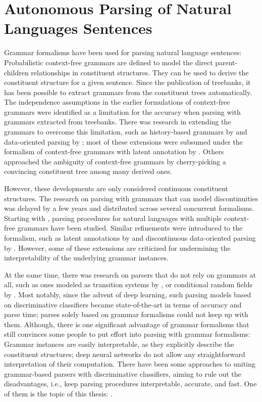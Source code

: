 \documentclass[../document.tex]{subfiles}
\begin{document}
    \section*{Autonomous Parsing of Natural Languages Sentences}
    Grammar formalisms have been used for parsing natural language sentences:
        Probabilistic context-free grammars are defined to model the direct parent-children relationships in constituent structures.
        They can be used to derive the constituent structure for a given sentence. \citep{Sup72}
    Since the publication of treebanks, it has been possible to extract grammars from the constituent trees automatically.
    The independence assumptions in the earlier formulations of context-free grammars were identified as a limitation for the accuracy when parsing with grammars extracted from treebanks. \citep[e.g.\@][Section~1.1]{collins2001convolution}
    There was research in extending the grammars to overcome this limitation, such as history-based grammars by \citet{Black94} and data-oriented parsing by \citet{Bod92}; most of these extensions were subsumed under the formalism of context-free grammars with latent annotation by \citet{Mat05,Petrov06}.
    Others approached the ambiguity of context-free grammars by cherry-picking a convincing constituent tree among many derived ones. \citep{Col00}
    
    However, these developments are only considered continuous constituent structures.
    The research on parsing with grammars that can model discontinuities was delayed by a few years and distributed across several concurrent formalisms.
    Starting with \citet{MaierSogaard08,Kal10}, parsing procedures for natural languages with multiple context-free grammars have been studied.
    Similar refinements were introduced to the formalism, such as latent annotations by \citet{Geb20} and discontinuous data-oriented parsing by \citet{Cra11}.
    However, some of these extensions are criticized for undermining the interpretability of the underlying grammar instances. \cite[Chapter 9]{Geb20}
    
    At the same time, there was research on parsers that do not rely on grammars at all, such as ones modeled as transition systems by \citet{Verseley14,CoaCoh19}, or conditional random fields by \citet{Petrov08}.
    Most notably, since the advent of deep learning, such parsing models based on discriminative classifiers became state-of-the-art in terms of accuracy and parse time; parses solely based on grammar formalisms could not keep up with them.
    Although, there is one significant advantage of grammar formalisms that still convinces some people to put effort into parsing with grammar formalisms:
        Grammar instances are easily interpretable, as they explicitly describe the constituent structures; deep neural networks do not allow any straightforward interpretation of their computation.
    There have been some approaches to uniting grammar-based parsers with discriminative classifiers, aiming to rule out the disadvantages, i.e.\@, keep parsing procedures interpretable, accurate, and fast.
    One of them is the topic of this thesis: .
    
\end{document}
